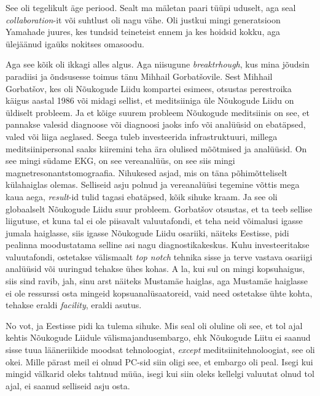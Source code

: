 See oli tegelikult äge periood. Sealt ma mäletan paari tüüpi uduselt, aga seal 
\emph{collaboration}-it või suhtlust oli nagu vähe. Oli justkui mingi 
generatsioon Yamahade juures, kes tundsid teineteist ennem ja kes hoidsid 
kokku, aga ülejäänud  igaüks  nokitses omasoodu. 

Aga see kõik oli ikkagi alles algus. Aga niisugune \emph{breaktrhough}, kus 
mina jõudsin paradiisi ja õndsusesse  toimus  tänu Mihhail Gorbatšovile. Sest 
Mihhail Gorbatšov, kes oli Nõukogude Liidu  kompartei esimees, otsustas 
perestroika käigus aastal 1986 või midagi sellist, et meditsiiniga üle Nõukogude 
Liidu on üldiselt probleem. Ja et kõige suurem probleem Nõukogude meditsiinis 
on see, et pannakse valesid diagnoose või diagnoosi jaoks info või analüüsid on 
ebatäpsed, valed või liiga aeglased. Seega tuleb investeerida infrastruktuuri, 
millega meditsiinipersonal saaks kiiremini teha ära olulised mõõtmised ja 
analüüsid. On see mingi südame EKG, on see vereanalüüs, on see siis mingi 
magnetresonantstomograafia. Nihukesed asjad, mis on täna põhimõtteliselt  
külahaiglas olemas. Selliseid asju polnud ja vereanalüüsi tegemine võttis mega 
kaua aega, \emph{result}-id tulid tagasi ebatäpsed, kõik sihuke kraam.  Ja see 
oli globaalselt Nõukogude Liidu suur probleem. Gorbatšov otsustas, et ta teeb 
sellise liigutuse, et kuna tal ei ole piisavalt valuutafondi, et teha neid 
võimalusi igasse jumala haiglasse, siis igasse Nõukogude Liidu osariiki, 
näiteks Eestisse, pidi pealinna moodustatama selline asi nagu 
diagnostikakeskus. Kuhu  investeeritakse valuutafondi, ostetakse välismaalt 
\emph{top notch} tehnika sisse ja terve vastava osariigi analüüsid või uuringud 
tehakse ühes kohas. A la, kui sul on mingi kopsuhaigus, siis sind ravib, jah, 
sinu arst näiteks Mustamäe haiglas, aga Mustamäe haiglasse ei ole ressurssi 
osta mingeid kopsuanalüsaatoreid, vaid need ostetakse ühte kohta,  tehakse 
eraldi \emph{facility}, eraldi asutus.

No vot, ja Eestisse pidi ka tulema sihuke. Mis seal oli oluline oli see, et 
 tol ajal kehtis Nõukogude Liidule välismajandusembargo, ehk Nõukogude 
Liitu ei saanud sisse tuua lääneriikide moodsat tehnoloogiat, \emph{except} 
meditsiinitehnoloogiat, see oli okei. Mille pärast meil ei olnud PC-sid siin 
oligi see, et  embargo oli peal. Isegi kui mingid välkarid oleks tahtnud müüa, 
isegi kui siin oleks kellelgi valuutat  olnud tol ajal, ei saanud  
selliseid asju osta. 

